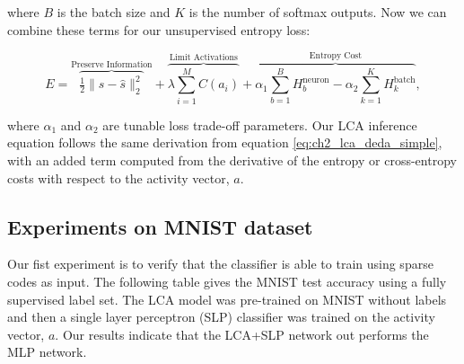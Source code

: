 \noindent where $B$ is the batch size and $K$ is the number of softmax outputs. Now we can combine these terms for our unsupervised entropy loss:

\begin{equation}\label{eq:ch3_lcaf_unsupervised_energy}
         E =
        \overbrace{ \tfrac{1}{2} \| s - \hat{s} \|_{2}^{2} }^\text{Preserve Information} +
        \overbrace{ \lambda \sum\limits_{i=1}^{M}C(a_{i}) }^\text{Limit Activations} +
        \overbrace{ \alpha_{1} \sum\limits_{b=1}^{B} H^{\text{neuron}}_{b} - \alpha_{2} \sum\limits_{k=1}^{K}H^{\text{batch}}_{k}}^\text{Entropy Cost},
\end{equation}

\noindent where $\alpha_{1}$ and $\alpha_{2}$ are tunable loss trade-off parameters. Our LCA inference equation follows the same derivation from equation \eqref{eq:ch2_lca_deda_simple}, with an added term computed from the derivative of the entropy or cross-entropy costs with respect to the activity vector, $a$.


\subsection{Experiments on MNIST dataset}
Our fist experiment is to verify that the classifier is able to train using sparse codes as input. The following table gives the MNIST test accuracy using a fully supervised label set. The LCA model was pre-trained on MNIST without labels and then a single layer perceptron (SLP) classifier was trained on the activity vector, $a$. Our results indicate that the LCA+SLP network out performs the MLP network.

